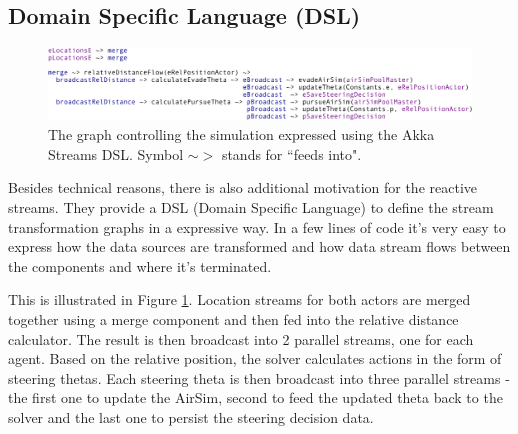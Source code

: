 \documentclass{article}
\let\cite\citep
\begin{document}
\subsection{Domain Specific Language (DSL)}
\begin{figure}
	\centering
	\includegraphics[width=17.0cm]{streams-SDL}
	\caption{The graph controlling the simulation expressed using the Akka Streams DSL. Symbol $\sim$$>$ stands for ``feeds into".}\label{fig:streas-SDL}
\end{figure}

Besides technical reasons, there is also additional motivation for the reactive streams. They provide a DSL (Domain Specific Language) \cite{dsl-book} to define the stream transformation graphs in a expressive way. In a few lines of code it's very easy to express how the data sources are transformed and how data stream flows between the components and where it's terminated.

This is illustrated in Figure \ref{fig:streas-SDL}. Location streams for both actors are merged together using a merge component and then fed into the relative distance calculator. The result is then broadcast into 2 parallel streams, one for each agent. Based on the relative position, the solver calculates actions in the form of steering thetas. Each steering theta is then broadcast into three parallel streams - the first one to update the AirSim, second to feed the updated theta back to the solver and the last one to persist the steering decision data.









 
\end{document}
